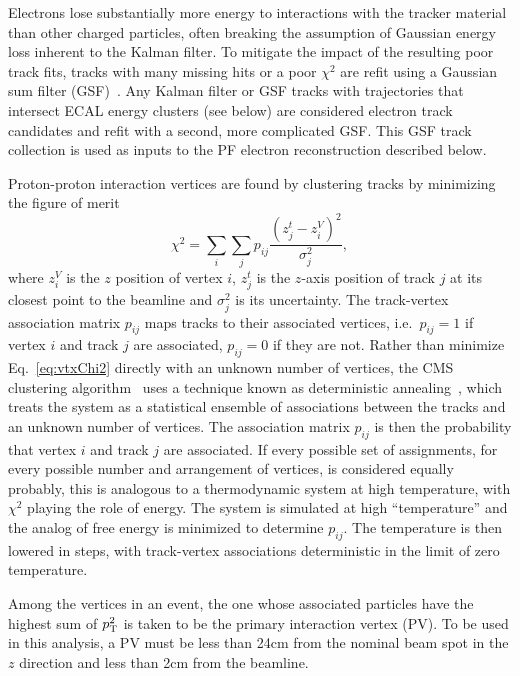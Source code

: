 Electrons lose substantially more energy to interactions with the tracker material than other charged particles, often breaking the assumption of Gaussian energy loss inherent to the Kalman filter.
To mitigate the impact of the resulting poor track fits, tracks with many missing hits or a poor $\chi^2$ are refit using a Gaussian sum filter (GSF)~\cite{Adam:2005bya}.
Any Kalman filter or GSF tracks with trajectories that intersect ECAL energy clusters (see below) are considered electron track candidates and refit with a second, more complicated GSF\@.
This GSF track collection is used as inputs to the PF electron reconstruction described below.

Proton-proton interaction vertices are found by clustering tracks by minimizing the figure of merit
\begin{equation}\label{eq:vtxChi2}
  \chi^2 = \sum_i \sum_j p_{ij} \frac{\left(z^t_j - z^V_i\right)^2}{\sigma_{j}^2},
\end{equation}
where $z^V_i$ is the $z$ position of vertex $i$, $z^t_j$ is the $z$-axis position of track $j$ at its closest point to the beamline and $\sigma_j^2$ is its uncertainty.
The track-vertex association matrix $p_{ij}$ maps tracks to their associated vertices, i.e.\ $p_{ij} = 1$ if vertex $i$ and track $j$ are associated, $p_{ij} = 0$ if they are not.
Rather than minimize Eq.~\ref{eq:vtxChi2} directly with an unknown number of vertices, the CMS clustering algorithm~\cite{Speer:2006mh,Chatrchyan:2014fea} uses a technique known as deterministic annealing~\cite{Rose:726788}, which treats the system as a statistical ensemble of associations between the tracks and an unknown number of vertices.
The association matrix $p_{ij}$ is then the probability that vertex $i$ and track $j$ are associated.
If every possible set of assignments, for every possible number and arrangement of vertices, is considered equally probably, this is analogous to a thermodynamic system at high temperature, with $\chi^2$ playing the role of energy.
The system is simulated at high ``temperature'' and the analog of free energy is minimized to determine $p_{ij}$.
The temperature is then lowered in steps, with track-vertex associations deterministic in the limit of zero temperature.

Among the vertices in an event, the one whose associated particles have the highest sum of $p_\mathrm{T}^2$ is taken to be the primary interaction vertex (PV).
To be used in this analysis, a PV must be less than 24\unit{cm} from the nominal beam spot in the $z$ direction and less than 2\unit{cm} from the beamline.



